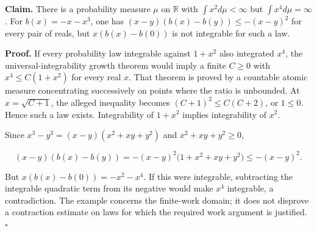 \documentclass[11pt,a4paper]{report}
\begin{document}
\textbf{Claim.} There is a probability measure \(\mu\) on \(\mathbb R\) with \(\int x^2d\mu<\infty\) but \(\int x^4d\mu=\infty\). For \(b(x)=-x-x^3\), one has \((x-y)(b(x)-b(y))\le-(x-y)^2\) for every pair of reals, but \(x(b(x)-b(0))\) is not integrable for such a law.



\textbf{Proof.} If every probability law integrable against \(1+x^2\) also integrated \(x^4\), the universal-integrability growth theorem would imply a finite \(C\ge0\) with \(x^4\le C(1+x^2)\) for every real \(x\). That theorem is proved by a countable atomic measure concentrating successively on points where the ratio is unbounded. At \(x=\sqrt{C+1}\), the alleged inequality becomes \((C+1)^2\le C(C+2)\), or \(1\le0\). Hence such a law exists. Integrability of \(1+x^2\) implies integrability of \(x^2\).



Since \(x^3-y^3=(x-y)(x^2+xy+y^2)\) and \(x^2+xy+y^2\ge0\),

\[(x-y)(b(x)-b(y))=-(x-y)^2\bigl(1+x^2+xy+y^2\bigr)\le-(x-y)^2.\]

But \(x(b(x)-b(0))=-x^2-x^4\). If this were integrable, subtracting the integrable quadratic term from its negative would make \(x^4\) integrable, a contradiction. The example concerns the finite-work domain; it does not disprove a contraction estimate on laws for which the required work argument is justified. \(\square\)
\end{document}
